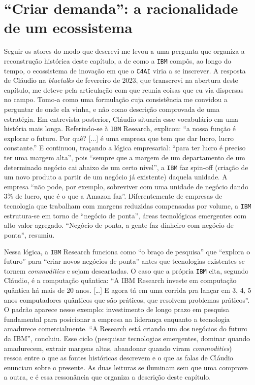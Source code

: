 \section{\enquote{Criar demanda}: a racionalidade de um ecossistema}
\label{sec:criar_demanda}

Seguir os atores do modo que descrevi me levou a uma pergunta que organiza a reconstrução histórica deste capítulo, a de como a \texttt{IBM} compôs, ao longo do tempo, o ecossistema de inovação em que o \texttt{C4AI} viria a se inscrever. A resposta de Cláudio na \textit{bluetalks} de fevereiro de 2023, que transcrevi na abertura deste capítulo, me deteve pela articulação com que reunia coisas que eu via dispersas no campo. Tomo-a como uma formulação cuja consistência me convidou a perguntar de onde ela vinha, e não como descrição comprovada de uma estratégia. Em entrevista posterior, Cláudio situaria esse vocabulário em uma história mais longa. Referindo-se à \texttt{IBM} Research, explicou: \enquote{a nossa função é explorar o futuro. Por quê? [...] é uma empresa que tem que dar lucro, lucro constante.} E continuou, traçando a lógica empresarial: \enquote{para ter lucro é preciso ter uma margem alta}, pois \enquote{sempre que a margem de um departamento de um determinado negócio cai abaixo de um certo nível}, a \texttt{IBM} faz spin-off (criação de um novo produto a partir de um negócio já existente) daquela unidade. A empresa \enquote{não pode, por exemplo, sobreviver com uma unidade de negócio dando 3\% de lucro, que é o que a Amazon faz}. Diferentemente de empresas de tecnologia que trabalham com margens reduzidas compensadas por volume, a \texttt{IBM} estrutura-se em torno de \enquote{negócio de ponta}, áreas tecnológicas emergentes com alto valor agregado. \enquote{Negócio de ponta, a gente faz dinheiro com negócio de ponta}, resumiu.

Nessa lógica, a \texttt{IBM} Research funciona como \enquote{o braço de pesquisa} que \enquote{explora o futuro} para \enquote{criar novos negócios de ponta} antes que tecnologias existentes se tornem \textit{commodities} e sejam descartadas. O caso que a própria \texttt{IBM} cita, segundo Cláudio, é a computação quântica: \enquote{A IBM Research investe em computação quântica há mais de 20 anos. [\ldots] E agora tá em uma corrida pra lançar em 3, 4, 5 anos computadores quânticos que são práticos, que resolvem problemas práticos}. O padrão aparece nesse exemplo: investimento de longo prazo em pesquisa fundamental para posicionar a empresa na liderança enquanto a tecnologia amadurece comercialmente. \enquote{A Research está criando um dos negócios do futuro da IBM}, concluiu. Esse ciclo (pesquisar tecnologias emergentes, dominar quando amadurecem, extrair margens altas, abandonar quando viram \textit{commodities}) ressoa entre o que as fontes históricas descrevem e o que as falas de Cláudio enunciam sobre o presente. As duas leituras se iluminam sem que uma comprove a outra, e é essa ressonância que organiza a descrição deste capítulo.

